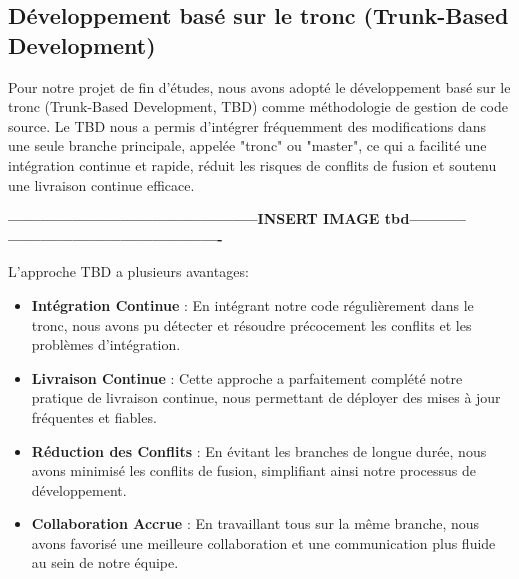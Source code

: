 \subsection{Développement basé sur le tronc (Trunk-Based Development)}

\hspace{\parindent} Pour notre projet de fin d’études, nous avons adopté le développement basé sur le tronc (Trunk-Based Development, TBD) comme méthodologie de gestion de code source. Le TBD nous a permis d'intégrer fréquemment des modifications dans une seule branche principale, appelée "tronc" ou "master", ce qui a facilité une intégration continue et rapide, réduit les risques de conflits de fusion et soutenu une livraison continue efficace.


\textbf{-----------------------------------------------INSERT IMAGE tbd-----------
----------------------------------------}

L'approche TBD a plusieurs avantages:
\begin{itemize}

    \item \textbf{Intégration Continue} : En intégrant notre code régulièrement dans le tronc, nous avons pu détecter et résoudre précocement les conflits et les problèmes d'intégration.
    
    \item \textbf{Livraison Continue} : Cette approche a parfaitement complété notre pratique de livraison continue, nous permettant de déployer des mises à jour fréquentes et fiables.

    \item \textbf{Réduction des Conflits} : En évitant les branches de longue durée, nous avons minimisé les conflits de fusion, simplifiant ainsi notre processus de développement.

    \item \textbf{Collaboration Accrue} : En travaillant tous sur la même branche, nous avons favorisé une meilleure collaboration et une communication plus fluide au sein de notre équipe.
    
\end{itemize}





